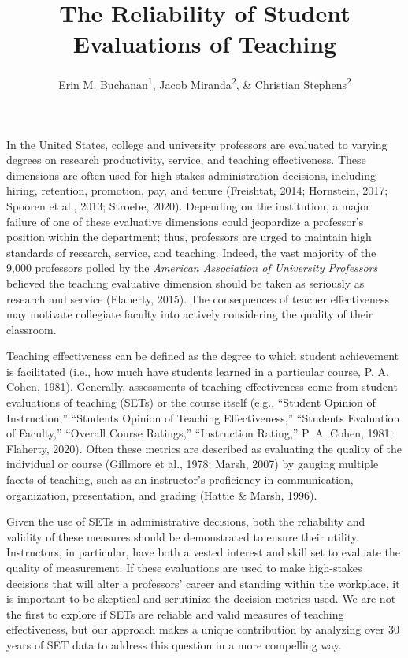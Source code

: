 \documentclass[
  man]{apa7}
\title{The Reliability of Student Evaluations of Teaching}
\author{Erin M. Buchanan\textsuperscript{1}, Jacob Miranda\textsuperscript{2}, \& Christian Stephens\textsuperscript{2}}
\date{}
\affiliation{\vspace{0.5cm}\textsuperscript{1} Harrisburg University of Science and Technology\\\textsuperscript{2} University of Alabama}
\begin{document}
\maketitle

In the United States, college and university professors are
evaluated to varying degrees on research productivity, service, and
teaching effectiveness. These dimensions are often used for high-stakes
administration decisions, including hiring, retention, promotion, pay,
and tenure (Freishtat, 2014; Hornstein, 2017; Spooren et al., 2013; Stroebe, 2020).
Depending on the institution, a major failure of one of these evaluative
dimensions could jeopardize a professor's position within the
department; thus, professors are urged to maintain high standards of
research, service, and teaching. Indeed, the vast majority of the 9,000
professors polled by the \emph{American Association of University Professors}
believed the teaching evaluative dimension should be taken as seriously
as research and service (Flaherty, 2015). The consequences of teacher
effectiveness may motivate collegiate faculty into actively considering
the quality of their classroom.

Teaching effectiveness can be defined as the degree to which student
achievement is facilitated (i.e., how much have students learned in a
particular course, P. A. Cohen, 1981). Generally, assessments of teaching
effectiveness come from student evaluations of teaching (SETs) or the
course itself (e.g., ``Student Opinion of Instruction,'' ``Students Opinion
of Teaching Effectiveness,'' ``Students Evaluation of Faculty,'' ``Overall
Course Ratings,'' ``Instruction Rating,'' P. A. Cohen, 1981; Flaherty, 2020). Often
these metrics are described as evaluating the quality of the individual
or course (Gillmore et al., 1978; Marsh, 2007) by gauging multiple facets of teaching, such as an instructor's proficiency in communication, organization, presentation, and grading (Hattie \& Marsh, 1996).

Given the use of SETs in administrative decisions, both the reliability and validity of these measures should be demonstrated to ensure their utility. Instructors, in particular, have both a vested interest and skill set to evaluate the quality of measurement. If these evaluations are used to make high-stakes decisions that will alter a professors' career and standing within the workplace, it is important to be skeptical and scrutinize the decision metrics used. We are not the first to explore if SETs are reliable and valid measures of teaching effectiveness, but our approach makes a unique contribution by analyzing over 30 years of SET data to address this question in a more compelling way.
\end{document}
